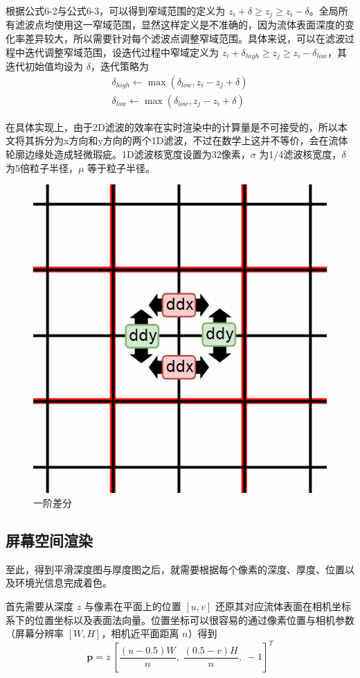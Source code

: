     根据公式6-2与公式6-3，可以得到窄域范围的定义为 $z_i + \delta \ge z_j \ge z_i - \delta$。全局所有滤波点均使用这一窄域范围，显然这样定义是不准确的，因为流体表面深度的变化率差异较大，所以需要针对每个滤波点调整窄域范围。具体来说，可以在滤波过程中迭代调整窄域范围，设迭代过程中窄域定义为 $z_i + \delta_{high} \ge z_j \ge z_i - \delta_{low}$，其迭代初始值均设为 $\delta$，迭代策略为
    \begin{equation}
    	\begin{gathered}
    	\delta_{high} \leftarrow \max (\delta_{low}, z_i - z_j + \delta) \\
    	\delta_{low} \leftarrow \max (\delta_{low}, z_j - z_i + \delta)
    	\end{gathered}
    \end{equation}
    
    在具体实现上，由于2D滤波的效率在实时渲染中的计算量是不可接受的，所以本文将其拆分为x方向和y方向的两个1D滤波，不过在数学上这并不等价，会在流体轮廓边缘处造成轻微瑕疵。1D滤波核宽度设置为32像素，$\sigma$ 为1/4滤波核宽度，$\delta$ 为5倍粒子半径，$\mu$ 等于粒子半径。
    
    \begin{figure}
    	\centering
    	\includegraphics[width=.25\textwidth]{figures/rendering/ddx_ddy.png}
    	\caption{一阶差分}
    	\label{fig:difference}
    \end{figure}

\subsection{屏幕空间渲染}
    至此，得到平滑深度图与厚度图之后，就需要根据每个像素的深度、厚度、位置以及环境光信息完成着色。
    
    首先需要从深度 $z$ 与像素在平面上的位置 $[u,v]$ 还原其对应流体表面在相机坐标系下的位置坐标以及表面法向量。位置坐标可以很容易的通过像素位置与相机参数（屏幕分辨率 $[W, H]$，相机近平面距离 $n$）得到
    \begin{equation}
    	\mathbf{p} = z \
    	\left[
    	\frac{(u - 0.5) W} {n}, \;
    	\frac{(0.5 - v) H}{n}, \;
    	-1
    	\right]^T
    \end{equation}
    
